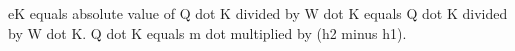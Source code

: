 eK equals absolute value of Q dot K divided by W dot K equals Q dot K divided by W dot K.  
Q dot K equals m dot multiplied by (h2 minus h1).